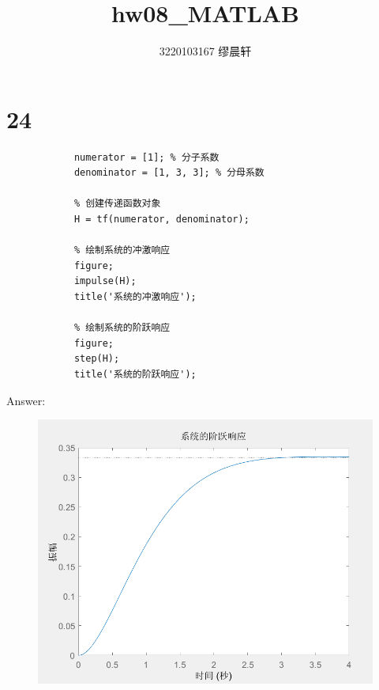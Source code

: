 \documentclass{article}
\title{hw08\_MATLAB}
\author{3220103167 缪晨轩}
\date{\zhdate{2024/5/18}}
\begin{document}
    \maketitle
    \section*{24}
        \begin{lstlisting}[caption={题24 MATLAB代码}, label={lst:matlab}]
            % 定义传递函数的分子和分母系数
            numerator = [1]; % 分子系数
            denominator = [1, 3, 3]; % 分母系数

            % 创建传递函数对象
            H = tf(numerator, denominator);

            % 绘制系统的冲激响应
            figure;
            impulse(H);
            title('系统的冲激响应');

            % 绘制系统的阶跃响应
            figure;
            step(H);
            title('系统的阶跃响应');

        \end{lstlisting}
        Answer: 
            \begin{figure}[h]
                \includegraphics[scale=0.6]{24_1.png}
            \end{figure}
            \FloatBarrier
\end{document}
